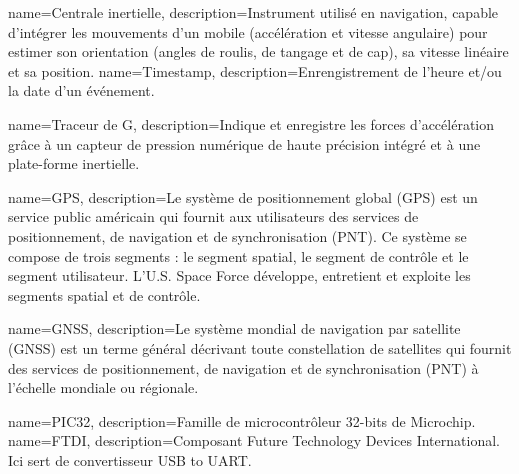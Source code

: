 
{
	name=Centrale inertielle,
	description={Instrument utilisé en navigation, capable d'intégrer les mouvements d'un mobile (accélération et vitesse angulaire) pour estimer son orientation (angles de roulis, de tangage et de cap), sa vitesse linéaire et sa position.}
}
{
	name=Timestamp,
	description={Enrengistrement de l'heure et/ou la date d'un événement.}
}

{
	name=Traceur de G,
	description={Indique et enregistre les forces d'accélération grâce à un capteur de pression numérique de haute précision intégré et à une plate-forme inertielle. }
}

{
	name=GPS,
	description={Le système de positionnement global (GPS) est un service public américain qui fournit aux utilisateurs des services de positionnement, de navigation et de synchronisation (PNT). Ce système se compose de trois segments : le segment spatial, le segment de contrôle et le segment utilisateur. L'U.S. Space Force développe, entretient et exploite les segments spatial et de contrôle.}
}

{
	name=GNSS,
	description={Le système mondial de navigation par satellite (GNSS) est un terme général décrivant toute constellation de satellites qui fournit des services de positionnement, de navigation et de synchronisation (PNT) à l'échelle mondiale ou régionale.}
}

{
	name=PIC32,
	description={Famille de microcontrôleur 32-bits de Microchip.}
}
{
	name=FTDI,
	description={Composant Future Technology Devices International. Ici sert de convertisseur USB to UART.}
}







